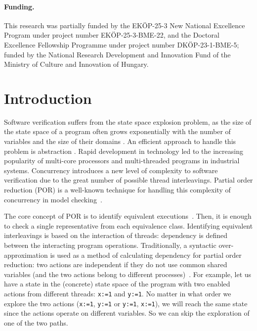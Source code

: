 \documentclass[numbook]{svjour3}
\begin{document}
\begin{footnotesize}
	\paragraph*{\footnotesize{Funding.}}
	This research was partially funded by the EKÖP-25-3 New National Excellence Program under project number EKÖP-25-3-BME-22, and the Doctoral Excellence Fellowship Programme under project number DKÖP-23-1-BME-5; funded by the National Research Development and Innovation Fund of the Ministry of Culture and Innovation of Hungary.
\end{footnotesize}


\section{Introduction}
\label{sec:intro}

Software verification suffers from the state space explosion problem, as the size of the state space of a program often grows exponentially with the number of variables and the size of their domains \cite{clarke_state_explosion}. An efficient approach to handle this problem is abstraction \cite{model_checking_1999,clarke_cegar}. Rapid development in technology led to the increasing popularity of multi-core processors and multi-threaded programs in industrial systems. Concurrency introduces a new level of complexity to software verification due to the great number of possible thread interleavings. Partial order reduction (POR) is a well-known technique for handling this complexity of concurrency in model checking~\cite{optimal_dpor,peled_10_years_of_por}.

The core concept of POR is to identify equivalent executions~\cite{godefroid-thesis}. Then, it is enough to check a single representative from each equivalence class. Identifying equivalent interleavings is based on the interaction of threads: dependency is defined between the interacting program operations. Traditionally, a syntactic over-approximation is used as a method of calculating dependency for partial order reduction: two actions are independent if they do not use common shared variables (and the two actions belong to different processes)~\cite{godefroid-thesis}. For example, let us have a state in the (concrete) state space of the program with two enabled actions from different threads: \texttt{x:=1} and \texttt{y:=1}. No matter in what order we explore the two actions (\texttt{x:=1}, \texttt{y:=1} or \texttt{y:=1}, \texttt{x:=1}), we will reach the same state since the actions operate on different variables. So we can skip the exploration of one of the two paths.
\end{document}
